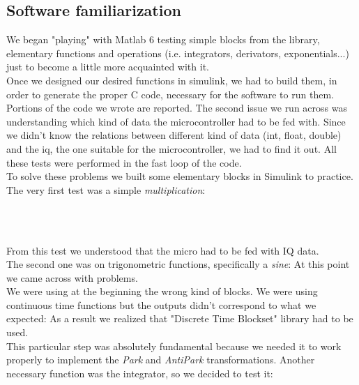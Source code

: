 \documentclass[12pt]{article}
\begin{document}
\newpage\subsection{Software familiarization}
We began "playing" with Matlab 6 testing simple blocks from the library, elementary functions and operations (i.e. integrators, derivators, exponentials...) just to become a little more acquainted with it.\\
Once we designed our desired functions in simulink, we had to build them, in order to generate the proper C code, necessary for the software to run them.
Portions of the code we wrote are reported. 
The second issue we run across was understanding which kind of data the microcontroller had to be fed with.
Since we didn't know the relations between different kind of data (int, float, double) and the iq, the one suitable for the microcontroller, we had to find it out. All these tests were performed in the fast loop of the code.\\
To solve these problems we built some elementary blocks in Simulink to practice.
The very first test was a simple \textit{multiplication}:\\
\begin{figure}[h]
\centering
{} \quad
{} \\
\end{figure}\\
From this test we understood that the micro had to be fed with IQ data.\\
The second one was on trigonometric functions, specifically a \textit{sine}:
At this point we came across with problems.\\
We were using at the beginning the wrong kind of blocks. We were using continuous time functions but the outputs didn't correspond to  what we expected:
As a result we realized that "Discrete Time Blockset" library had to be used.\\ 
This particular step was absolutely fundamental because we needed it to work properly to implement the \textit{Park} and \textit{AntiPark} transformations.
Another necessary function was the integrator, so we decided to test it:
\end{document}
